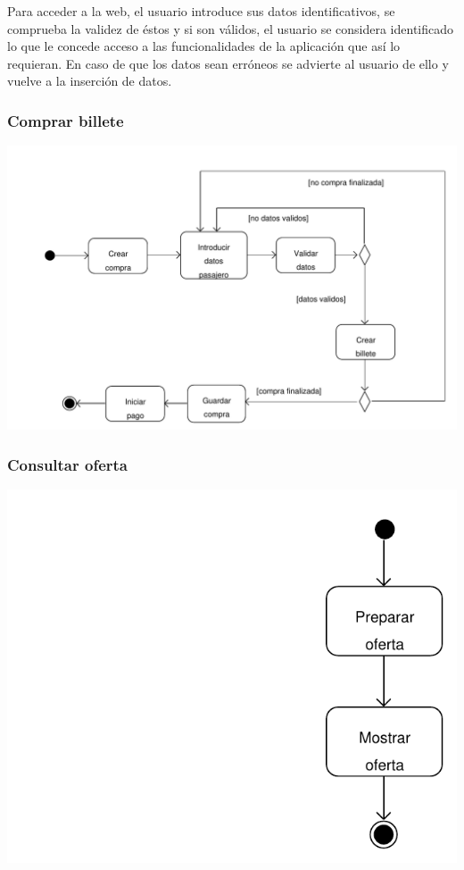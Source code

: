 \documentclass[11pt, a4paper, twoside, titlepage]{article}
\begin{document}
				Para acceder a la web, el usuario introduce sus datos identificativos, se comprueba la validez de éstos y si son válidos, el usuario se considera identificado lo que le concede acceso a las funcionalidades de la aplicación que así lo requieran. En caso de que los datos sean erróneos se advierte al usuario de ello y vuelve a la inserción de datos.

			\subsubsection{Comprar billete}
				\begin{center}
					\includegraphics[scale=.72]{analisis/diagramas/da_comprarbillete.pdf}
				\end{center}

			\subsubsection{Consultar oferta}
				\begin{center}
					\includegraphics[scale=.7]{analisis/diagramas/da_consultaroferta.pdf}
				\end{center}
\end{document}
